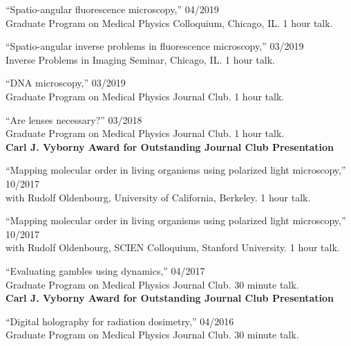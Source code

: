 \documentclass[12pt,letterpaper]{article}
\begin{document}
\begin{benumerate}{8}
\item {``Spatio-angular fluorescence microscopy,'' \hfill 04/2019\\
     Graduate Program on Medical Physics Colloquium, Chicago, IL. 1 hour talk.}
  
\item {``Spatio-angular inverse problems in fluorescence microscopy,'' \hfill 03/2019\\
     Inverse Problems in Imaging Seminar, Chicago, IL. 1 hour talk.}

\item {``DNA microscopy,'' \hfill 03/2019\\
    Graduate Program on Medical Physics Journal Club. 1 hour talk.}
  
\item {``Are lenses necessary?'' \hfill 03/2018\\
    Graduate Program on Medical Physics Journal Club. 1 hour talk.\\
    \textbf{Carl J. Vyborny Award for Outstanding Journal Club Presentation}  }
  
\item {``Mapping molecular order in living organisms using polarized light microscopy,'' \hfill 10/2017\\
    with Rudolf Oldenbourg, University of California, Berkeley. 1 hour talk.}
  
\item {``Mapping molecular order in living organisms using polarized light microscopy,'' \hfill 10/2017\\
    with Rudolf Oldenbourg, SCIEN Colloquium, Stanford University. 1 hour talk.}
  
\item {``Evaluating gambles using dynamics,'' \hfill 04/2017\\
    Graduate Program on Medical Physics Journal Club. 30 minute talk.\\
    \textbf{Carl J. Vyborny Award for Outstanding Journal Club Presentation}}

\item {``Digital holography for radiation dosimetry,'' \hfill 04/2016\\
    Graduate Program on Medical Physics Journal Club. 30 minute talk.}
\end{benumerate}
\end{document}
